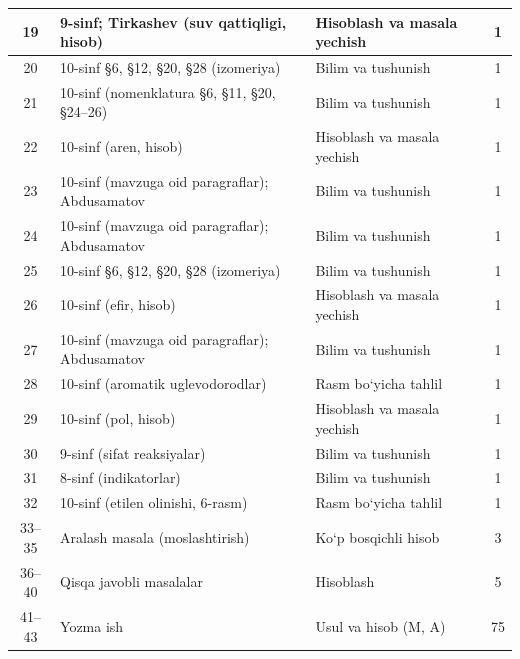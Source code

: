 \documentclass[11pt,a4paper]{article}
\begin{document}
{\begin{longtable}{|c|p{7.2cm}|p{5.4cm}|c|}
19 & 9-sinf; Tirkashev (suv qattiqligi, hisob) & Hisoblash va masala yechish & 1\\\hline
20 & 10-sinf \S{}6, \S{}12, \S{}20, \S{}28 (izomeriya) & Bilim va tushunish & 1\\\hline
21 & 10-sinf (nomenklatura \S{}6, \S{}11, \S{}20, \S{}24--26) & Bilim va tushunish & 1\\\hline
22 & 10-sinf (aren, hisob) & Hisoblash va masala yechish & 1\\\hline
23 & 10-sinf (mavzuga oid paragraflar); Abdusamatov & Bilim va tushunish & 1\\\hline
24 & 10-sinf (mavzuga oid paragraflar); Abdusamatov & Bilim va tushunish & 1\\\hline
25 & 10-sinf \S{}6, \S{}12, \S{}20, \S{}28 (izomeriya) & Bilim va tushunish & 1\\\hline
26 & 10-sinf (efir, hisob) & Hisoblash va masala yechish & 1\\\hline
27 & 10-sinf (mavzuga oid paragraflar); Abdusamatov & Bilim va tushunish & 1\\\hline
28 & 10-sinf (aromatik uglevodorodlar) & Rasm bo`yicha tahlil & 1\\\hline
29 & 10-sinf (pol, hisob) & Hisoblash va masala yechish & 1\\\hline
30 & 9-sinf (sifat reaksiyalar) & Bilim va tushunish & 1\\\hline
31 & 8-sinf (indikatorlar) & Bilim va tushunish & 1\\\hline
32 & 10-sinf (etilen olinishi, 6-rasm) & Rasm bo`yicha tahlil & 1\\\hline
33--35 & Aralash masala (moslashtirish) & Ko`p bosqichli hisob & 3\\\hline
36--40 & Qisqa javobli masalalar & Hisoblash & 5\\\hline
41--43 & Yozma ish & Usul va hisob (M, A) & 75\\\hline
\end{longtable}}
\end{document}
